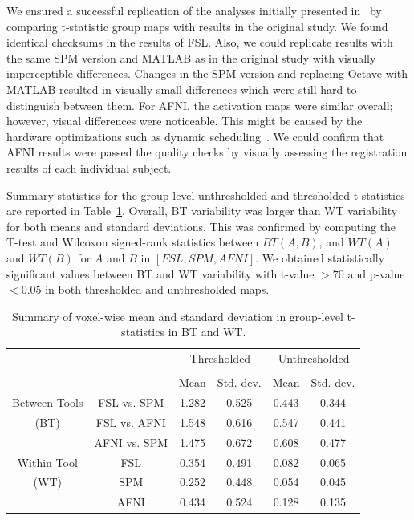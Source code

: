We ensured a successful replication of the analyses initially presented in~\cite{bowring2019exploring}
by comparing t-statistic group maps with results in the original study.
We found identical checksums in the results of FSL.
Also, we could replicate results with the same SPM version and MATLAB as in the original study with visually imperceptible differences.
Changes in the SPM version and replacing Octave with MATLAB resulted in visually small differences which were still hard to distinguish between them.
For AFNI, the activation maps were similar overall; however, visual differences were noticeable.
This might be caused by the hardware optimizations such as dynamic scheduling~\cite{demmel2013numerical}.
We could confirm that AFNI results were passed the quality checks by visually assessing the registration results of each individual subject.

Summary statistics for the group-level unthresholded and thresholded t-statistics are reported in Table~\ref{table:pipeline-stats}.
Overall, BT variability was larger than WT variability for both means and standard deviations.
This was confirmed by computing the T-test and Wilcoxon signed-rank statistics between $BT(A, B)$, and $WT(A)$ and $WT(B)$ for $A$ and $B$ in $[FSL, SPM, AFNI]$.
We obtained statistically significant values between BT and WT variability with t-value $> 70$ and p-value $< 0.05$ in both thresholded and unthresholded maps.

\setlength{\tabcolsep}{5pt}
\begin{table}[h]
    \centering
    \begin{tabular}{cccc|cc}
        \toprule
        \multirow{2}{*}{}& {} & \multicolumn{2}{c}{Thresholded} & \multicolumn{2}{c}{Unthresholded} \\
        \cmidrule{3-4} \cmidrule{5-6} \\
        {} & {} & Mean & Std. dev. & Mean & Std. dev. \\
        \midrule
        \rowcolor{lightgray}
        {Between Tools} & FSL vs. SPM        &  1.282       & 0.525      & 0.443     & 0.344  \\
        \rowcolor{lightgray}
        {(BT)} & FSL vs. AFNI                &  1.548       & 0.616      & 0.547     & 0.441  \\
        \rowcolor{lightgray}
        {} & AFNI vs. SPM                    &  1.475       & 0.672      & 0.608     & 0.477  \\
        {Within Tool} & FSL                  &  0.354       & 0.491      & 0.082     & 0.065  \\
        {(WT)}   & SPM                       &  0.252       & 0.448      & 0.054     & 0.045  \\
        {}   & AFNI                          &  0.434       & 0.524      & 0.128     & 0.135  \\
        \bottomrule
    \end{tabular}
    \caption{Summary of voxel-wise mean and standard deviation in group-level t-statistics in BT and WT.}
    \label{table:pipeline-stats}
\end{table}



